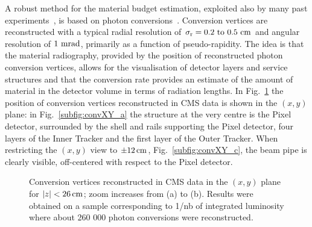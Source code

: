 \documentclass[a4paper]{jpconf}
\begin{document}
A robust method for the material budget estimation, exploited also by many
past experiments~\cite{steve}, is based on photon conversions~\cite{TRK-10-003}. 
Conversion vertices are reconstructed with a typical radial resolution of $\rm \sigma_r = 0.2 ~to~  0.5~cm$ and  angular resolution of  $1~{\rm mrad}$, primarily
as a function of pseudo-rapidity.
The idea is that the
material radiography, provided by the position of reconstructed photon
conversion vertices, allows for the visualisation of detector layers
and service structures and that the conversion rate provides an estimate of the amount of material in the
detector volume in terms of radiation lengths.
In Fig.~\ref{fig:convXY} the position of conversion vertices reconstructed in CMS data is shown in the $(x,y)$ plane:
in Fig.~\ref{subfig:convXY_a} the structure at the very centre is the Pixel detector,
surrounded by the shell and rails supporting the Pixel detector, four layers of the Inner Tracker and the first layer of the Outer Tracker.
When restricting the $(x,y)$ view to $\pm 12\rm \, cm$, Fig.~\ref{subfig:convXY_c}, the beam pipe is clearly visible, off-centered with respect to
the Pixel detector. 
%
\begin{figure}[t!]
  \begin{center}
    \caption{Conversion vertices reconstructed in CMS data in the $(x,y)$ plane for $|z|<26\rm \, cm$; zoom increases from (a) to (b). 
    Results were obtained on a sample corresponding to 1/nb of integrated luminosity where about 260 000 photon conversions were reconstructed. 
}
\label{fig:convXY}
\end{center}
\end{figure}
\end{document}
